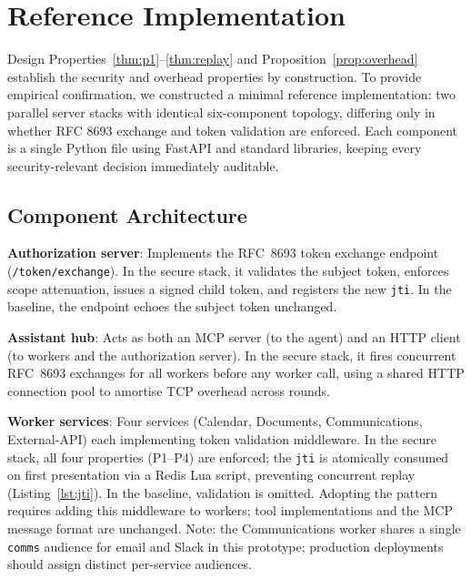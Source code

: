 \documentclass[journal]{IEEEtran}
\theoremstyle{definition}
\begin{document}
\section{Reference Implementation}
\label{sec:impl}

Design Properties~\ref{thm:p1}--\ref{thm:replay} and Proposition~\ref{prop:overhead}
establish the security and overhead properties by construction. To provide
empirical confirmation, we constructed a minimal reference implementation:
two parallel server stacks with identical six-component topology, differing only
in whether RFC 8693 exchange and token validation are enforced. Each component
is a single Python file using FastAPI and standard libraries, keeping every
security-relevant decision immediately auditable.

\subsection{Component Architecture}

\textbf{Authorization server}: Implements the RFC~8693
token exchange endpoint (\texttt{/token/exchange}).
In the secure stack, it validates the subject token, enforces scope
attenuation, issues a signed child token, and registers the new
\texttt{jti}. In the baseline, the endpoint echoes the subject token
unchanged.

\textbf{Assistant hub}: Acts as both an MCP server (to the agent)
and an HTTP client (to workers and the authorization server). In the
secure stack, it fires concurrent RFC~8693 exchanges for all workers
before any worker call, using a shared HTTP connection pool to
amortise TCP overhead across rounds.

\textbf{Worker services}: Four services (Calendar, Documents,
Communications, External-API) each implementing token validation
middleware. In the secure stack, all four properties (P1--P4) are
enforced; the \texttt{jti} is atomically consumed on first
presentation via a Redis Lua script, preventing concurrent replay
(Listing~\ref{lst:jti}). In the baseline, validation is omitted.
Adopting the pattern requires adding this middleware to workers; tool
implementations and the MCP message format are unchanged. Note: the
Communications worker shares a single \texttt{comms} audience for
email and Slack in this prototype; production deployments should
assign distinct per-service audiences.
\end{document}
